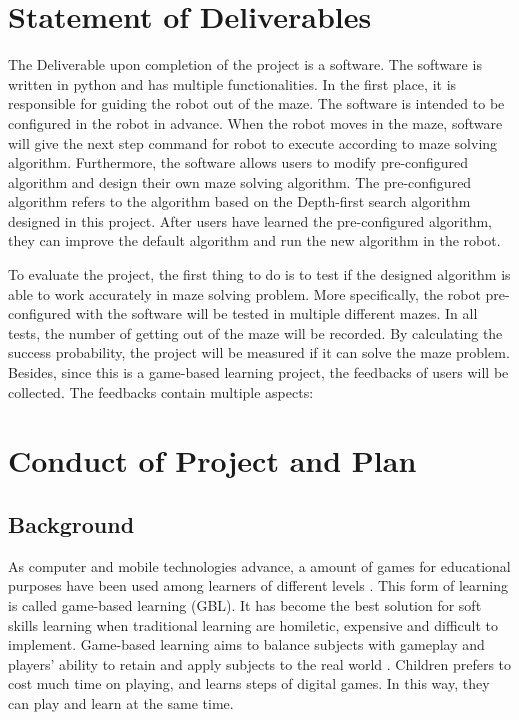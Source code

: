 \documentclass[11pt,times,oneside,openright,hardcopy]{eeereport}
\begin{document}
\section{Statement of Deliverables}
The Deliverable upon completion of the project is a software. The software is written in python and has multiple functionalities. In the first place, it is responsible for guiding the robot out of the maze.
The software is intended to be configured in the robot in advance. When the robot moves in the maze, software will give the next step command for robot to execute according to maze solving algorithm.
Furthermore, the software allows users to modify pre-configured algorithm and design their own maze solving algorithm. The pre-configured algorithm refers to the algorithm based on the Depth-first search algorithm designed in this project.
After users have learned the pre-configured algorithm, they can improve the default algorithm and run the new algorithm in the robot.

To evaluate the project, the first thing to do is to test if the designed algorithm is able to work accurately in maze solving problem. More specifically, the robot pre-configured with the software will be tested in multiple different mazes.
In all tests, the number of getting out of the maze will be recorded. By calculating the success probability, the project will be measured if it can solve the maze problem.
Besides, since this is a game-based learning project, the feedbacks of users will be collected. The feedbacks contain multiple aspects:


\section{Conduct of Project and Plan}
\subsection{Background}
As computer and mobile technologies advance, a amount of games for educational purposes have been used among learners of different levels \cite{Proulx:2018fr}. 
This form of learning is called game-based learning (GBL). It has become the best solution for soft skills learning when traditional learning are homiletic, expensive and difficult to implement.
Game-based learning aims to balance subjects with gameplay and players' ability to retain and apply subjects to the real world \cite{Ifenthaler:2012tn}. 
Children prefers to cost much time on playing, and learns steps of digital games. In this way, they can play and learn at the same time.
\end{document}
